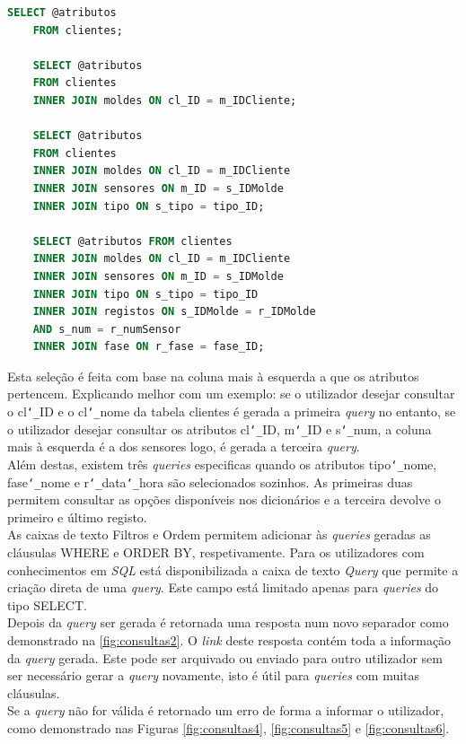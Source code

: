 \documentclass[11pt,twoside,a4paper]{report}
\begin{document}
\begin{lstlisting}[language = SQL]
	SELECT @atributos
	FROM clientes;
	
	SELECT @atributos
	FROM clientes
	INNER JOIN moldes ON cl_ID = m_IDCliente;
	
	SELECT @atributos
	FROM clientes
	INNER JOIN moldes ON cl_ID = m_IDCliente
	INNER JOIN sensores ON m_ID = s_IDMolde
	INNER JOIN tipo ON s_tipo = tipo_ID;
	
	SELECT @atributos FROM clientes
	INNER JOIN moldes ON cl_ID = m_IDCliente
	INNER JOIN sensores ON m_ID = s_IDMolde 
	INNER JOIN tipo ON s_tipo = tipo_ID
	INNER JOIN registos ON s_IDMolde = r_IDMolde
	AND s_num = r_numSensor
	INNER JOIN fase ON r_fase = fase_ID;
\end{lstlisting}
Esta seleção é feita com base na coluna mais à esquerda a que os atributos pertencem. Explicando melhor com um exemplo: se o utilizador desejar consultar o cl\texttt{\char`_}ID e o cl\texttt{\char`_}nome da tabela clientes é gerada a primeira \textit{query} no entanto, se o utilizador desejar consultar os atributos cl\texttt{\char`_}ID, m\texttt{\char`_}ID e s\texttt{\char`_}num, a coluna mais à esquerda é a dos sensores logo, é gerada a terceira \textit{query}.\\
Além destas, existem três \textit{queries} especificas quando os atributos tipo\texttt{\char`_}nome, fase\texttt{\char`_}nome e r\texttt{\char`_}data\texttt{\char`_}hora são selecionados sozinhos. As primeiras duas permitem consultar as opções disponíveis nos dicionários e a terceira devolve o primeiro e último registo.\\
As caixas de texto Filtros e Ordem permitem adicionar às \textit{queries} geradas as cláusulas WHERE e ORDER BY, respetivamente. Para os utilizadores com conhecimentos em \textit{SQL} está disponibilizada a caixa de texto \textit{Query} que permite a criação direta de uma \textit{query}. Este campo está limitado apenas para \textit{queries} do tipo SELECT.\\
Depois da \textit{query} ser gerada é retornada uma resposta num novo separador como demonstrado na \autoref{fig:consultas2}. O \textit{link} deste resposta contém toda a informação da \textit{query} gerada. Este pode ser arquivado ou enviado para outro utilizador sem ser necessário gerar a \textit{query} novamente, isto é útil para \textit{queries} com muitas cláusulas.\\
Se a \textit{query} não for válida é retornado um erro de forma a informar o utilizador, como demonstrado nas Figuras \ref{fig:consultas4}, \ref{fig:consultas5} e \ref{fig:consultas6}.
\end{document}
